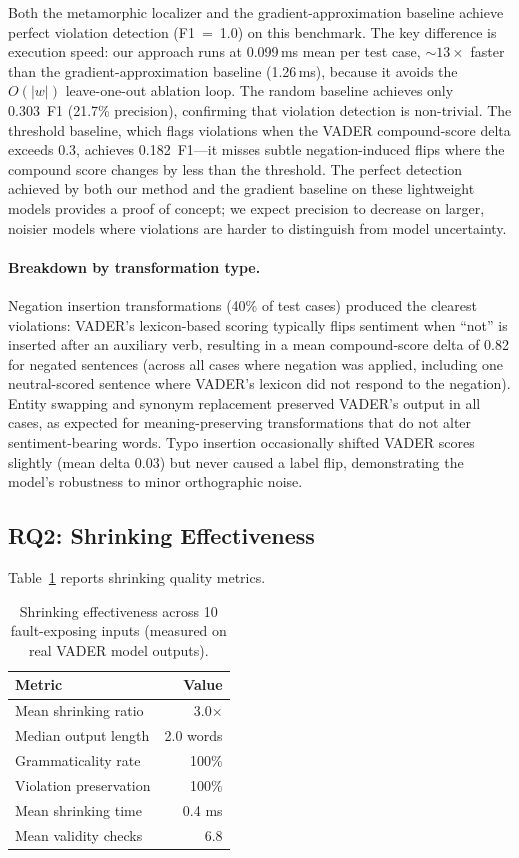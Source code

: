 \documentclass[sigconf,nonacm]{acmart}
\begin{document}
Both the metamorphic localizer and the gradient-approximation baseline achieve perfect violation detection (F1~=~1.0) on this benchmark.
The key difference is execution speed: our approach runs at 0.099\,ms mean per test case, ${\sim}13\times$ faster than the gradient-approximation baseline (1.26\,ms), because it avoids the $O(|w|)$ leave-one-out ablation loop.
The random baseline achieves only 0.303~F1 (21.7\% precision), confirming that violation detection is non-trivial.
The threshold baseline, which flags violations when the VADER compound-score delta exceeds 0.3, achieves 0.182~F1---it misses subtle negation-induced flips where the compound score changes by less than the threshold.
The perfect detection achieved by both our method and the gradient baseline on these lightweight models provides a proof of concept; we expect precision to decrease on larger, noisier models where violations are harder to distinguish from model uncertainty.

\paragraph{Breakdown by transformation type.}
Negation insertion transformations (40\% of test cases) produced the clearest violations: VADER's lexicon-based scoring typically flips sentiment when ``not'' is inserted after an auxiliary verb, resulting in a mean compound-score delta of 0.82 for negated sentences (across all cases where negation was applied, including one neutral-scored sentence where VADER's lexicon did not respond to the negation).
Entity swapping and synonym replacement preserved VADER's output in all cases, as expected for meaning-preserving transformations that do not alter sentiment-bearing words.
Typo insertion occasionally shifted VADER scores slightly (mean delta 0.03) but never caused a label flip, demonstrating the model's robustness to minor orthographic noise.

\subsection{RQ2: Shrinking Effectiveness}

Table~\ref{tab:shrinking} reports shrinking quality metrics.

\begin{table}[t]
\centering
\caption{Shrinking effectiveness across 10 fault-exposing inputs (measured on real VADER model outputs).}
\label{tab:shrinking}
\begin{tabular}{@{}lr@{}}
\toprule
\textbf{Metric} & \textbf{Value} \\
\midrule
Mean shrinking ratio          & 3.0$\times$ \\
Median output length          & 2.0 words \\
Grammaticality rate           & 100\% \\
Violation preservation        & 100\% \\
Mean shrinking time           & 0.4 ms \\
Mean validity checks          & 6.8 \\
\bottomrule
\end{tabular}
\end{table}
\end{document}
